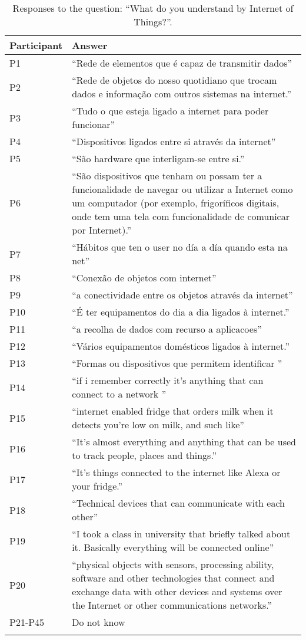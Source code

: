 \begin{longtable}{p{3cm} p{12cm}}
    \hline
    \textbf{Participant} & \textbf{Answer} \\
    \hline
    P1 & ``Rede de elementos que é capaz de transmitir dados'' \\
    \hline
    P2 & ``Rede de objetos do nosso quotidiano que trocam dados e informação com outros sistemas na internet.'' \\
    \hline
    P3 & ``Tudo o que esteja ligado a internet para poder funcionar'' \\
    \hline
    P4 & ``Dispositivos ligados entre si através da internet'' \\
    \hline
    P5 & ``São hardware que interligam-se entre si.'' \\
    \hline
    P6 & ``São dispositivos que tenham ou possam ter a funcionalidade de navegar ou utilizar a Internet como um computador (por exemplo, frigoríficos digitais, onde tem uma tela com funcionalidade de comunicar por Internet).'' \\
    \hline
    P7 & ``Hábitos que ten o user no día a día quando esta na net'' \\
    \hline
    P8 & ``Conexão de objetos com internet'' \\
    \hline
    P9 & ``a conectividade entre os objetos através da internet'' \\
    \hline
    P10 & ``É ter equipamentos do dia a dia ligados à internet.'' \\
    \hline
    P11 & ``a recolha  de dados com recurso a aplicacoes'' \\
    \hline
    P12 & ``Vários equipamentos domésticos ligados à internet.'' \\
    \hline
    P13 & ``Formas ou dispositivos que permitem identificar '' \\
    \hline
    P14 & ``if i remember correctly it's anything that can connect to a network '' \\
    \hline
    P15 & ``internet enabled fridge that orders milk when it detects you're low on milk, and such like'' \\
    \hline
    P16 & ``It's almost everything and anything that can be used to track people, places and things.'' \\
    \hline
    P17 & ``It's things connected to the internet like Alexa or your fridge.'' \\
    \hline
    P18 & ``Technical devices that can communicate with each other'' \\
    \hline
    P19 & ``I took a class in university that briefly talked about it. Basically everything will be connected online'' \\
    \hline
    P20 & ``physical objects with sensors, processing ability, software and other technologies that connect and exchange data with other devices and systems over the Internet or other communications networks.'' \\
    \hline
    P21-P45 & Do not know \\
    \hline
    \caption*{Responses to the question: ``What do you understand by Internet of Things?''.}
    \label{table:survey_s6_q1}
\end{longtable}

